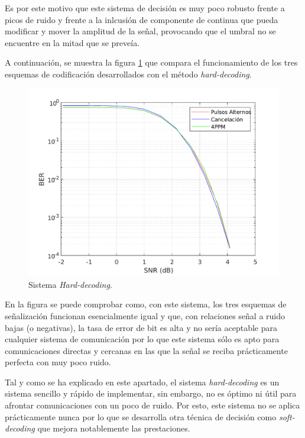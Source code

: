 Es por este motivo que este sistema de decisión es muy poco robusto frente a picos de 
ruido y frente a la inlcusión de componente de continua que pueda modificar y mover 
la amplitud de la señal, provocando que el umbral no se encuentre en la mitad que 
se preveía.

A continuación, se muestra la figura \ref{hard-decoding} que compara el funcionamiento de 
los tres esquemas de codificación desarrollados con el método \textit{hard-decoding}.

\begin{figure}[ht]
    \centering
    \includegraphics[scale=0.65]{./figuras/Hard.pdf}
    \caption{\small{Sistema \textit{Hard-decoding}.}}
    \label{hard-decoding}%
\end{figure}

En la figura se puede comprobar como, con este sistema, los tres esquemas de señalización 
funcionan esencialmente igual y que, con relaciones señal a ruido bajas (o negativas), la 
tasa de error de bit es alta y no sería aceptable para cualquier sistema de comunicación
por lo que este sistema sólo es apto para comunicaciones directas y cercanas en las que 
la señal se reciba prácticamente perfecta con muy poco ruido.

Tal y como se ha explicado en este apartado, el sistema \textit{hard-decoding} es 
un sistema sencillo y rápido de implementar, sin embargo, no es 
óptimo ni útil para afrontar comunicaciones con un poco de ruido. Por esto, este sistema
no se aplica prácticamente nunca por lo que 
se desarrolla otra técnica de decisión como \textit{soft-decoding} que mejora notablemente
las prestaciones.

